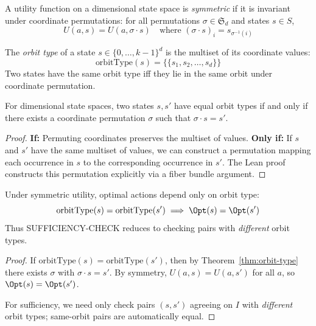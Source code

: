 \begin{definition}\label{def:symmetric}
A utility function on a dimensional state space is \emph{symmetric} if it is invariant under coordinate permutations: for all permutations $\sigma \in \mathfrak{S}_d$ and states $s \in S$,
\[
U(a, s) = U(a, \sigma \cdot s) \quad \text{where } (\sigma \cdot s)_i = s_{\sigma^{-1}(i)}
\]
\end{definition}

\begin{definition}\label{def:orbit-type}
The \emph{orbit type} of a state $s \in \{0, \ldots, k-1\}^d$ is the multiset of its coordinate values:
\[
\text{orbitType}(s) = \{\!\{s_1, s_2, \ldots, s_d\}\!\}
\]
Two states have the same orbit type iff they lie in the same orbit under coordinate permutation.
\end{definition}

\begin{theorem}\label{thm:orbit-type}
For dimensional state spaces, two states $s, s'$ have equal orbit types if and only if there exists a coordinate permutation $\sigma$ such that $\sigma \cdot s = s'$.
\end{theorem}

\begin{proof}
\textbf{If:} Permuting coordinates preserves the multiset of values.
\textbf{Only if:} If $s$ and $s'$ have the same multiset of values, we can construct a permutation mapping each occurrence in $s$ to the corresponding occurrence in $s'$. The Lean proof constructs this permutation explicitly via a fiber bundle argument.
\end{proof}

\begin{theorem}\label{thm:symmetric-reduction}
Under symmetric utility, optimal actions depend only on orbit type:
\[
\text{orbitType}(s) = \text{orbitType}(s') \implies \Opt(s) = \Opt(s')
\]
Thus SUFFICIENCY-CHECK reduces to checking pairs with \emph{different} orbit types.
\end{theorem}

\begin{proof}
If $\text{orbitType}(s) = \text{orbitType}(s')$, then by Theorem~\ref{thm:orbit-type} there exists $\sigma$ with $\sigma \cdot s = s'$. By symmetry, $U(a, s) = U(a, s')$ for all $a$, so $\Opt(s) = \Opt(s')$.

For sufficiency, we need only check pairs $(s, s')$ agreeing on $I$ with \emph{different} orbit types; same-orbit pairs are automatically equal.
\end{proof}

